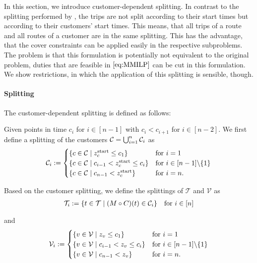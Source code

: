 In this section, we introduce customer-dependent splitting. In contrast to the splitting performed by \cite{Knoll}, the trips are not split according to their start times but according to their customers' start times. This means, that all trips of a route and all routes of a customer are in the same splitting. This has the advantage, that the cover constraints can be applied easily in the respective subproblems. The problem is that this formulation is potentially not equivalent to the original problem, \ie duties that are feasible in $\eqref{eq:MMILP}$ can be cut in this formulation. We show restrictions, in which the application of this splitting is sensible, though. 

\paragraph{Splitting} \parfill

The customer-dependent splitting is defined as follows:

\begin{definition}
\label{def:customer_dependent_splitting}

Given points in time $c_i$ for $i\in[n-1]$ with $c_i<c_{i+1}$ for $i\in[n-2]$. We first define a splitting of the customers $\mathcal{C}=\bigcup_{i=1}^n\mathcal{C}_i$ as
\begin{align*}
	\mathcal{C}_i := \begin{cases}
		\left\{c\in\mathcal{C}\mid z^{\operatorname{start}}_c\leq c_1\right\} & \text{for } i=1 \\
		\left\{c\in\mathcal{C}\mid c_{i-1}<z^{\operatorname{start}}_c\leq c_i\right\} & \text{for } i\in[n-1]\backslash\{1\} \\
		\left\{c\in\mathcal{C}\mid c_{n-1}<z^{\operatorname{start}}_c\right\} & \text{for } i=n.
	\end{cases}
\end{align*}

Based on the customer splitting, we define the splittings of $\mathcal{T}$ and $\mathcal{V}$ as
\begin{align*}
	\mathcal{T}_i := \left\{t\in\mathcal{T}\mid (M\circ C)(t)\in\mathcal{C}_i\right\} && \text{for } i\in[n]
\end{align*}

and
\begin{align*}
	\mathcal{V}_i := \begin{cases}
		\left\{v\in\mathcal{V}\mid z_v\leq c_1\right\} & \text{for } i=1 \\
		\left\{v\in\mathcal{V}\mid c_{i-1}<z_v\leq c_i\right\} & \text{for } i\in[n-1]\backslash\{1\} \\
		\left\{v\in\mathcal{V}\mid c_{n-1}<z_v\right\} & \text{for } i=n.
	\end{cases}
\end{align*}

\end{definition}

